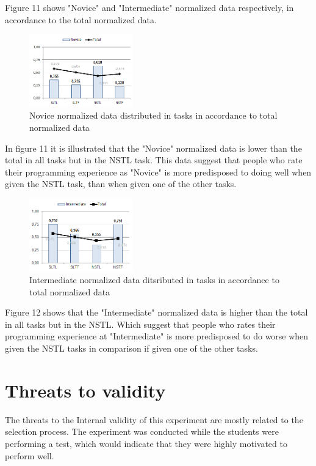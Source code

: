 \documentclass{sig-alternate-05-2015}
\begin{document}
Figure 11 shows "Novice" and "Intermediate" normalized data respectively, in accordance to the total normalized data.

\begin{figure}[H]
	\centering
	\includegraphics[width=0.4\textwidth]{img11}
	\caption{Novice normalized data distributed in tasks in accordance to total normalized data}
\end{figure}

In figure 11 it is illustrated that the "Novice" normalized data is lower than the total in all tasks but in the NSTL task. This data suggest that people who rate their programming experience as "Novice" is more predisposed to doing well when given the NSTL task, than when given one of the other tasks.

\begin{figure}[H]
	\centering
	\includegraphics[width=0.4\textwidth]{img12}
	\caption{Intermediate normalized data ditsributed in tasks in accordance to total normalized data}
\end{figure}

Figure 12 shows that the "Intermediate" normalized data is higher than the total in all tasks but in the NSTL. Which suggest that people who rates their programming experience at "Intermediate" is more predisposed to do worse when given the NSTL tasks in comparison if given one of the other tasks.

\section{Threats to validity}

The threats to the Internal validity of this experiment are mostly related to the selection process. The experiment was conducted while the students were performing a test, which would indicate that they were highly motivated to perform well.\\
\end{document}
